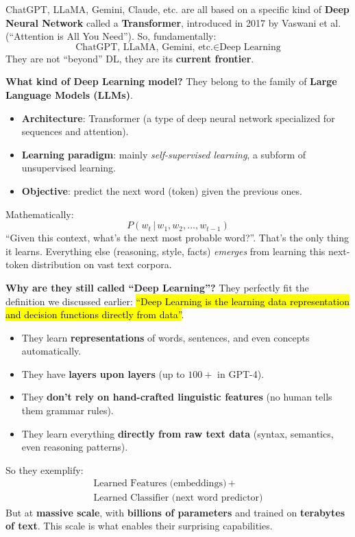\newpage

\begin{deepeningbox}
    ChatGPT, LLaMA, Gemini, Claude, etc. are all based on a specific kind of \textbf{Deep Neural Network} called a \textbf{Transformer}, introduced in 2017 by Vaswani et al. (``Attention is All You Need''). So, fundamentally:
    \begin{equation*}
        \text{ChatGPT, LLaMA, Gemini, etc.} \in \text{Deep Learning}
    \end{equation*}
    They are not ``beyond'' DL, they are its \textbf{current frontier}.

    \highspace
    \textcolor{Green3}{ \textbf{What kind of Deep Learning model?}} They belong to the family of \textbf{Large Language Models (LLMs)}.
    \begin{itemize}
        \item \textbf{Architecture}: Transformer (a type of deep neural network specialized for sequences and attention).
        \item \textbf{Learning paradigm}: mainly \emph{self-supervised learning}, a subform of unsupervised learning.
        \item \textbf{Objective}: predict the next word (token) given the previous ones.
    \end{itemize}
    Mathematically:
    \begin{equation*}
        P\left(w_t \, | \, w_1, w_2, \dots, w_{t-1}\right)
    \end{equation*}
    ``Given this context, what's the next most probable word?''. That's the only thing it learns. Everything else (reasoning, style, facts) \emph{emerges} from learning this next-token distribution on vast text corpora.

    \highspace
    \textcolor{Green3}{ \textbf{Why are they still called ``Deep Learning''?}} They perfectly fit the definition we discussed earlier: \hl{``Deep Learning is the learning data representation and decision functions directly from data''}.
    \begin{itemize}
        \item They learn \textbf{representations} of words, sentences, and even concepts automatically.
        \item They have \textbf{layers upon layers} (up to $100+$ in GPT-4).
        \item They \textbf{don't rely on hand-crafted linguistic features} (no human tells them grammar rules).
        \item They learn everything \textbf{directly from raw text data} (syntax, semantics, even reasoning patterns).
    \end{itemize}
    So they exemplify:
    \begin{gather*}
        \text{Learned Features (embeddings)} \, + \\
        \text{Learned Classifier (next word predictor)}
    \end{gather*}
    But at \textbf{massive scale}, with \textbf{billions of parameters} and trained on \textbf{terabytes of text}. This scale is what enables their surprising capabilities.


\end{deepeningbox}
